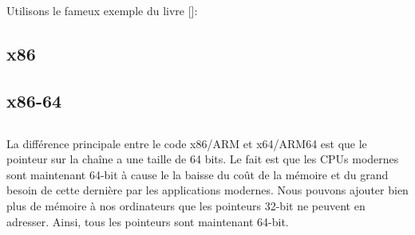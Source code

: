 \mysection{\HelloWorldSectionName}
\label{sec:helloworld}

Utilisons le fameux exemple du livre [\KRBook]:



\subsection{x86}





\subsection{x86-64}







\subsection{\Conclusion{}}

La différence principale entre le code x86/ARM et x64/ARM64 est que le pointeur sur la chaîne a une taille de 64 bits.
Le fait est que les \ac{CPU}s modernes sont maintenant 64-bit à cause le la baisse du coût de la mémoire et du grand
besoin de cette dernière par les applications modernes.
Nous pouvons ajouter bien plus de mémoire à nos ordinateurs que les pointeurs 32-bit ne peuvent en adresser.
Ainsi, tous les pointeurs sont maintenant 64-bit.



